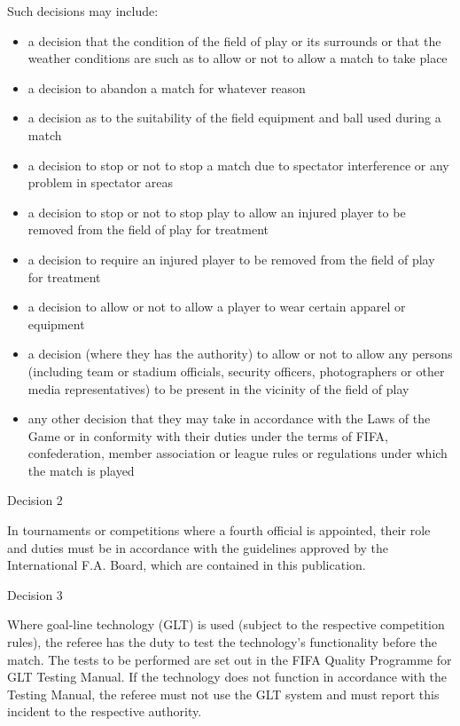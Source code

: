 \bigskip

Such decisions may include:

\begin{itemize}
\item a decision that the condition of the field of play or its surrounds or that the weather conditions are such as to allow or not to allow a match to take place
\item a decision to abandon a match for whatever reason
\item a decision as to the suitability of the field equipment and ball used during a match
\item a decision to stop or not to stop a match due to spectator interference or any problem in spectator areas 
\item a decision to stop or not to stop play to allow an injured player to be removed from the field of play for treatment 
\item a decision to require an injured player to be removed from the field of play for treatment 
\item a decision to allow or not to allow a player to wear certain apparel or equipment 
\item a decision (where they has the authority) to allow or not to allow any persons (including team or stadium officials, security officers, photographers or other media representatives) to be present in the vicinity of the field of play 
\item any other decision that they may take in accordance with the Laws of the Game or in conformity with their duties under the terms of FIFA, confederation, member association or league rules or regulations under which the match is played 
\end{itemize}

\bigskip

Decision 2

In tournaments or competitions where a fourth official is appointed, their role and duties must be in accordance with the guidelines approved by the International F.A. Board, which are contained in this publication.

\bigskip

Decision 3

Where goal-line technology (GLT) is used (subject to the respective competition rules), the referee has the duty to test the technology's functionality before the match. The tests to be performed are set out in the FIFA Quality Programme for GLT Testing Manual. If the technology does not function in accordance with the Testing Manual, the referee must not use the GLT system and must report this incident to the respective authority. 